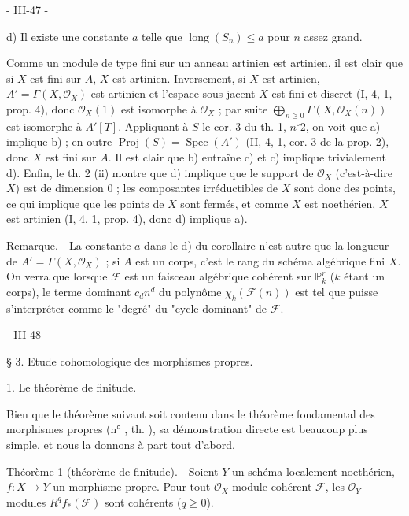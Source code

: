 \newpage


- III-47 -

d) Il existe une constante $a$ telle que $\operatorname{long}(S_n) \le a$ pour $n$ assez grand.

Comme un module de type fini sur un anneau artinien est artinien, il est clair que si $X$ est fini sur $A$, $X$ est artinien. Inversement, si $X$ est artinien, $A' = \Gamma(X, \mathcal{O}_X)$ est artinien et l'espace sous-jacent $X$ est fini et discret (I, 4, 1, prop. 4), donc $\mathcal{O}_X(1)$ est isomorphe à $\mathcal{O}_X$ ; par suite $\bigoplus_{n \ge 0} \Gamma(X, \mathcal{O}_X(n))$ est isomorphe à $A'[T]$. Appliquant à $S$ le cor. 3 du th. 1, $n^\circ 2$, on voit que a) implique b) ; en outre $\operatorname{Proj}(S) = \operatorname{Spec}(A')$ (II, 4, 1, cor. 3 de la prop. 2), donc $X$ est fini sur $A$. Il est clair que b) entraîne c) et c) implique trivialement d). Enfin, le th. 2 (ii) montre que d) implique que le support de $\mathcal{O}_X$ (c'est-à-dire $X$) est de dimension 0 ; les composantes irréductibles de $X$ sont donc des points, ce qui implique que les points de $X$ sont fermés, et comme $X$ est noethérien, $X$ est artinien (I, 4, 1, prop. 4), donc d) implique a).

Remarque. - La constante $a$ dans le d) du corollaire n'est autre que la longueur de $A' = \Gamma(X, \mathcal{O}_X)$ ; si $A$ est un corps, c'est le rang du schéma algébrique fini $X$. On verra que lorsque $\mathcal{F}$ est un faisceau algébrique cohérent sur $\mathbb{P}^r_k$ ($k$ étant un corps), le terme dominant $c_d n^d$ du polynôme $\chi_k(\mathcal{F}(n))$ est tel que puisse s'interpréter comme le "degré" du "cycle dominant" de $\mathcal{F}$.

\newpage



- III-48 -

§ 3. Etude cohomologique des morphismes propres.

1. Le théorème de finitude.

Bien que le théorème suivant soit contenu dans le théorème fondamental des morphismes propres (n° , th. ), sa démonstration directe est beaucoup plus simple, et nous la donnons à part tout d'abord.

Théorème 1 (théorème de finitude). - Soient $Y$ un schéma localement noethérien, $f: X \to Y$ un morphisme propre. Pour tout $\mathcal{O}_X$-module cohérent $\mathcal{F}$, les $\mathcal{O}_Y$-modules $R^q f_*(\mathcal{F})$ sont cohérents ($q \ge 0$).

